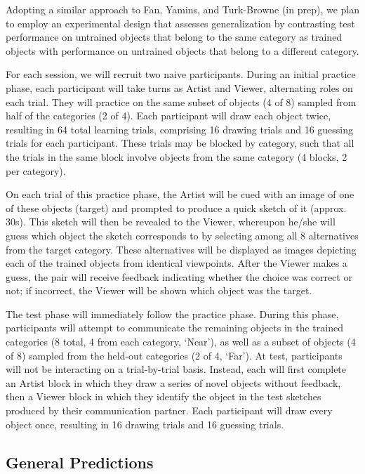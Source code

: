 \documentclass[12pt]{article}
\begin{document}
Adopting a similar approach to Fan, Yamins, and Turk-Browne (in prep), we plan to employ an experimental design that assesses generalization by contrasting test performance on untrained objects that belong to the same category as trained objects with performance on untrained objects that belong to a different category. 

For each session, we will recruit two naive participants. During an initial practice phase, each participant will take turns as Artist and Viewer, alternating roles on each trial. They will practice on the same subset of objects (4 of 8) sampled from half of the categories (2 of 4). Each participant will draw each object twice, resulting in 64 total learning trials, comprising 16 drawing trials and 16 guessing trials for each participant. These trials may be blocked by category, such that all the trials in the same block involve objects from the same category (4 blocks, 2 per category). 

On each trial of this practice phase, the Artist will be cued with an image of one of these objects (target) and prompted to produce a quick sketch of it (approx. 30s). This sketch will then be revealed to the Viewer, whereupon he/she will guess which object the sketch corresponds to by selecting among all 8 alternatives from the target category. These alternatives will be displayed as images depicting each of the trained objects from identical viewpoints. After the Viewer makes a guess, the pair will receive feedback indicating whether the choice was correct or not; if incorrect, the Viewer will be shown which object was the target. 

The test phase will immediately follow the practice phase. During this phase, participants will attempt to communicate the remaining objects in the trained categories (8 total, 4 from each category, `Near'), as well as a subset of objects (4 of 8) sampled from the held-out categories (2 of 4, `Far'). At test, participants will not be interacting on a trial-by-trial basis. Instead, each will first complete an Artist block in which they draw a series of novel objects without feedback, then a Viewer block in which they identify the object in the test sketches produced by their communication partner. Each participant will draw every object once, resulting in 16 drawing trials and 16 guessing trials. 

\subsection{General Predictions}
\end{document}
